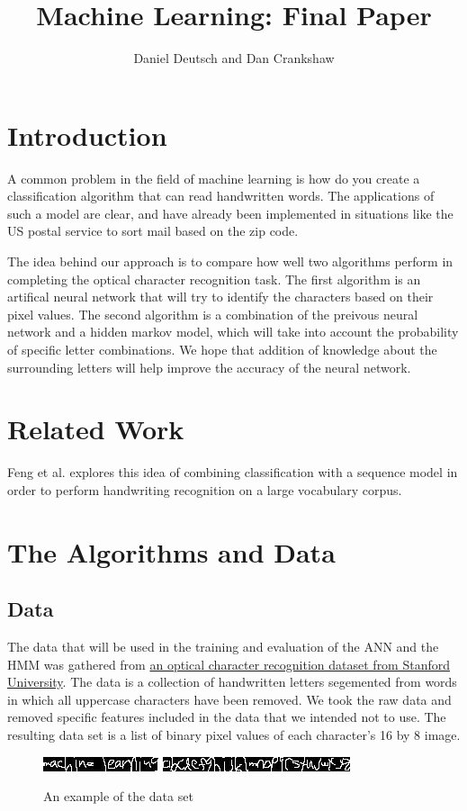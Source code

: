 \documentclass[11pt,a4paper,twocolumn]{article}
\author{Daniel Deutsch and Dan Crankshaw}
\title{Machine Learning: Final Paper}
\date{}
\begin{document}
\maketitle

\section{Introduction}

A common problem in the field of machine learning is how do you create a classification algorithm that can read handwritten words. The applications of such a model are clear, and have already been implemented in situations like the US postal service to sort mail based on the zip code. 

The idea behind our approach is to compare how well two algorithms perform in completing the optical character recognition task. The first algorithm is an artifical neural network that will try to identify the characters based on their pixel values. The second algorithm is a combination of the preivous neural network and a hidden markov model, which will take into account the probability of specific letter combinations. We hope that addition of knowledge about the surrounding letters will help improve the accuracy of the neural network.

\section{Related Work}

Feng et al.\cite{feng2008hidden} explores this idea of combining classification with a sequence model in order to perform handwriting recognition on a large vocabulary corpus. 


\section{The Algorithms and Data}

\subsection*{Data}

The data that will be used in the training and evaluation of the ANN and the HMM was gathered from
\href{http://ai.stanford.edu/~btaskar/ocr/}{an optical character recognition dataset from Stanford University}. The data is a collection of handwritten letters segemented from words in which all uppercase characters have been removed. We took the raw data and removed specific features included in the data that we intended not to use. The resulting data set is a list of binary pixel values of each character's 16 by 8 image.
\begin{figure}[h]
\centering
\includegraphics{img/ml.jpg}
\includegraphics{img/alphabet.jpg}
\caption{An example of the data set}
\end{figure}
\end{document}
